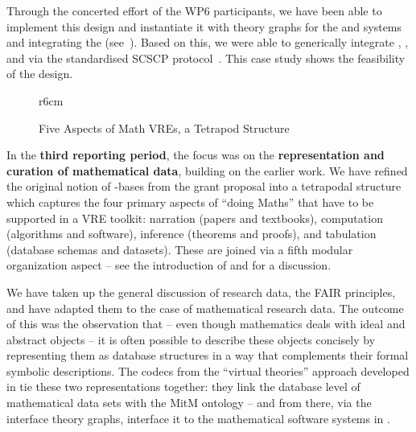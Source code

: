 Through the concerted effort of the WP6 participants, we have been able to implement this design and instantiate it with theory graphs for the \GAP and \Sage systems and integrating the \LMFDB (see~\cite{ODK-D6.5}).
Based on this, we were able to generically integrate \GAP, \Sage, and \LMFDB via the standardised SCSCP protocol~\cite{HorRoz:ossp09}. This case study shows the feasibility of the design. 

\begin{wrapfigure}r{6cm}\vspace*{-1em}
\vspace*{.5em}
\caption{Five Aspects of Math VREs, a Tetrapod Structure}\label{fig:tetrapod}\vspace*{-1.5em}
\end{wrapfigure}
In the \textbf{third reporting period}, the focus was on the \textbf{representation and curation of mathematical data}, building on the earlier work. We have refined the original notion of \DKS-bases from the grant proposal into a tetrapodal structure which captures the four primary aspects of ``doing Maths'' that have to be supported in a VRE toolkit: narration (papers and textbooks), computation (algorithms and software), inference (theorems and proofs), and tabulation (database schemas and datasets).
These are joined via a fifth modular organization aspect -- see the introduction  of \cite{ODK-D6.10} and \cite{CarFarKohRab:bmobb19} for a discussion.

We have taken up the general discussion of research data, the FAIR principles, and have adapted them to the case of mathematical research data. The outcome of this was the observation that -- even though mathematics deals with ideal and abstract objects -- it is often possible to describe these objects concisely by representing them as database structures in a way that complements their formal symbolic descriptions. The codecs from the ``virtual theories'' approach developed in  tie these two representations together: they link the database level of mathematical data sets with the MitM ontology -- and from there, via the interface theory graphs, interface it to the mathematical software systems in \pn.

